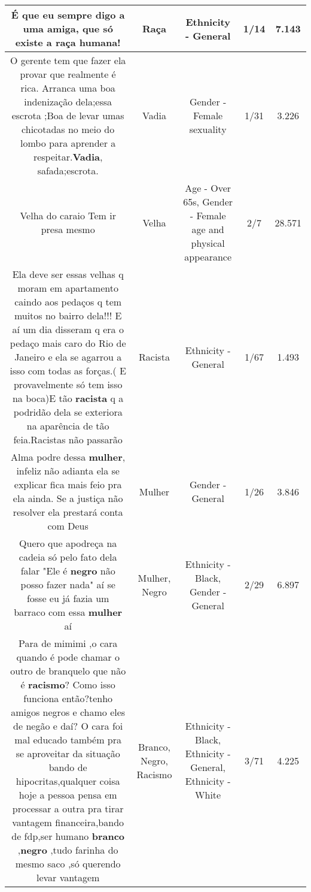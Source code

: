 \documentclass[11pt]{article}
\newlength\mylength
\begin{document}
\begin{center}
\begin{longtable}{|C{.65\mylength}|C{.30\mylength}|C{.12\mylength}|C{.12\mylength}|C{.12\mylength}|}
  \small É que eu sempre digo a uma amiga, que só existe a \textbf{raça} humana!\normalsize   & Raça & Ethnicity - General & 1/14 & 7.143 \\  \hline
  \small O gerente tem que fazer ela provar que realmente é rica. Arranca uma boa indenização dela;essa escrota ;Boa de levar umas chicotadas no meio do lombo para aprender a respeitar.\textbf{Vadia}, safada;escrota.\normalsize   & Vadia & Gender - Female sexuality & 1/31 & 3.226 \\  \hline
  \small Velha do caraio Tem ir presa mesmo\normalsize   & Velha & Age - Over 65s, Gender - Female age and physical appearance & 2/7 & 28.571 \\  \hline
  \small Ela deve ser essas velhas q moram em apartamento caindo aos pedaços q tem muitos no bairro dela!!! E aí um dia disseram q era o pedaço mais caro do Rio de Janeiro e ela se agarrou a isso com todas as forças.( E provavelmente só tem isso na boca)E tão \textbf{racista} q a podridão dela se exteriora na aparência de tão feia.Racistas não passarão\normalsize   & Racista & Ethnicity - General & 1/67 & 1.493 \\  \hline
  \small Alma podre dessa \textbf{mulher}, infeliz não adianta ela se explicar fica mais feio pra ela ainda. Se a justiça não resolver ela prestará conta com Deus\normalsize   & Mulher & Gender - General & 1/26 & 3.846 \\  \hline
  \small Quero que apodreça na cadeia só pelo fato dela falar "Ele é \textbf{negro} não posso fazer nada" aí se fosse eu já fazia um barraco com essa \textbf{mulher} aí\normalsize   & Mulher, Negro & Ethnicity - Black, Gender - General & 2/29 & 6.897 \\  \hline
  \small Para de mimimi ,o cara quando é pode chamar o outro de branquelo que não é \textbf{racismo}? Como isso funciona então?tenho amigos negros e chamo eles de negão e daí? O cara foi mal educado também pra se aproveitar da situação bando de hipocritas,qualquer coisa hoje a pessoa pensa em processar a outra pra tirar vantagem financeira,bando de fdp,ser humano \textbf{branco} ,\textbf{negro} ,tudo  farinha do mesmo saco ,só querendo levar vantagem\normalsize   & Branco, Negro, Racismo & Ethnicity - Black, Ethnicity - General, Ethnicity - White & 3/71 & 4.225 \\  \hline

\end{longtable}
\end{center}
\end{document}
